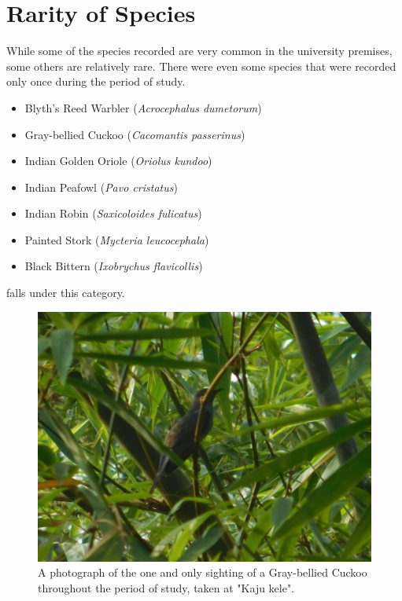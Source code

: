 \section{Rarity of Species}
While some of the species recorded are very common in the university premises, some others are relatively rare. There were even some species that were recorded only once during the period of study.
\begin{itemize}
    \item Blyth's Reed Warbler (\textit{Acrocephalus dumetorum})
    \item Gray-bellied Cuckoo (\textit{Cacomantis passerinus})
    \item Indian Golden Oriole (\textit{Oriolus kundoo})
    \item Indian Peafowl (\textit{Pavo cristatus})
    \item Indian Robin (\textit{Saxicoloides fulicatus})
    \item Painted Stork (\textit{Mycteria leucocephala})
    \item Black Bittern (\textit{Ixobrychus flavicollis})
\end{itemize}
falls under this category.
\begin{figure}[!htpb]
    \centering
    \includegraphics[width=\linewidth]{Figures/gray-bellied-cuckoo.JPG}
    \caption[]{A photograph of the one and only sighting of a Gray-bellied Cuckoo throughout the period of study, taken at "Kaju kele".}
    \label{fig:figure-01}
\end{figure}


